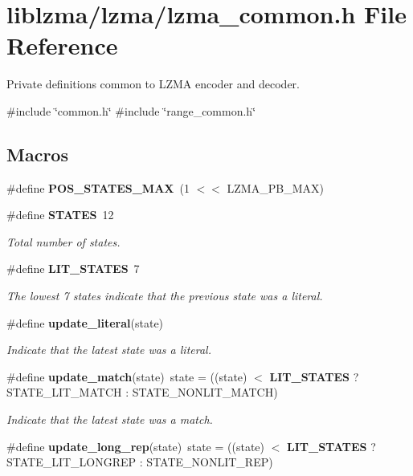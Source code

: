 \section{liblzma/lzma/lzma\+\_\+common.h File Reference}
\label{lzma__common_8h}


Private definitions common to L\+Z\+MA encoder and decoder.  


{\ttfamily \#include \char`\"{}common.\+h\char`\"{}}\newline
{\ttfamily \#include \char`\"{}range\+\_\+common.\+h\char`\"{}}\newline
\subsection*{Macros}
\begin{DoxyCompactItemize}
\item 
\#define \textbf{ P\+O\+S\+\_\+\+S\+T\+A\+T\+E\+S\+\_\+\+M\+AX}~(1 $<$$<$ L\+Z\+M\+A\+\_\+\+P\+B\+\_\+\+M\+AX)
\item 
\#define \textbf{ S\+T\+A\+T\+ES}~12
\begin{DoxyCompactList}\small\item\em Total number of states. \end{DoxyCompactList}\item 
\#define \textbf{ L\+I\+T\+\_\+\+S\+T\+A\+T\+ES}~7
\begin{DoxyCompactList}\small\item\em The lowest 7 states indicate that the previous state was a literal. \end{DoxyCompactList}\item 
\#define \textbf{ update\+\_\+literal}(state)
\begin{DoxyCompactList}\small\item\em Indicate that the latest state was a literal. \end{DoxyCompactList}\item 
\#define \textbf{ update\+\_\+match}(state)~state = ((state) $<$ \textbf{ L\+I\+T\+\_\+\+S\+T\+A\+T\+ES} ? S\+T\+A\+T\+E\+\_\+\+L\+I\+T\+\_\+\+M\+A\+T\+CH \+: S\+T\+A\+T\+E\+\_\+\+N\+O\+N\+L\+I\+T\+\_\+\+M\+A\+T\+CH)
\begin{DoxyCompactList}\small\item\em Indicate that the latest state was a match. \end{DoxyCompactList}\item 
\#define \textbf{ update\+\_\+long\+\_\+rep}(state)~state = ((state) $<$ \textbf{ L\+I\+T\+\_\+\+S\+T\+A\+T\+ES} ? S\+T\+A\+T\+E\+\_\+\+L\+I\+T\+\_\+\+L\+O\+N\+G\+R\+EP \+: S\+T\+A\+T\+E\+\_\+\+N\+O\+N\+L\+I\+T\+\_\+\+R\+EP)
$$
\end{DoxyCompactItemize}
